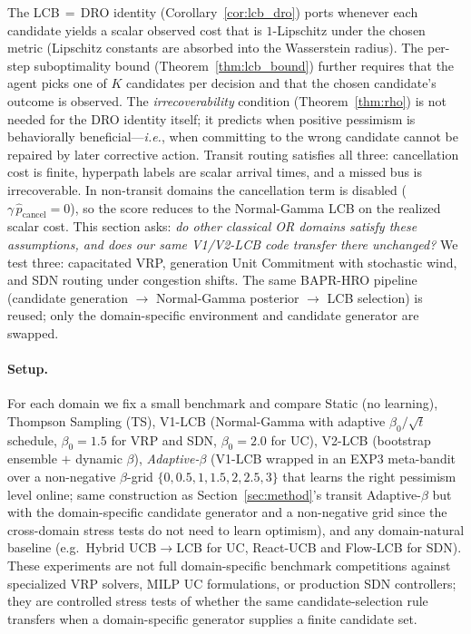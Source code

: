 \documentclass[11pt]{article}
\theoremstyle{definition}
\theoremstyle{remark}
\begin{document}
The LCB$\,=\,$DRO identity (Corollary~\ref{cor:lcb_dro}) ports
whenever each candidate yields a scalar observed cost that is
$1$-Lipschitz under the chosen metric (Lipschitz constants are
absorbed into the Wasserstein radius). The per-step suboptimality
bound (Theorem~\ref{thm:lcb_bound}) further requires that the agent
picks one of $K$ candidates per decision and that the chosen
candidate's outcome is observed. The \emph{irrecoverability}
condition (Theorem~\ref{thm:rho}) is not needed for the DRO identity
itself; it predicts when positive pessimism is behaviorally
beneficial---\emph{i.e.}, when committing to the wrong candidate
cannot be repaired by later corrective action. Transit routing
satisfies all three: cancellation cost is finite, hyperpath labels
are scalar arrival times, and a missed bus is irrecoverable. In
non-transit domains the cancellation term is disabled
($\gamma\,\hat p_{\mathrm{cancel}}=0$), so the score reduces to the
Normal-Gamma LCB on the realized scalar cost.
This section asks: \emph{do other classical OR domains satisfy these
assumptions, and does our same V1/V2-LCB code transfer there
unchanged?} We test three: capacitated VRP, generation Unit
Commitment with stochastic wind, and SDN routing under congestion
shifts. The same BAPR-HRO pipeline (candidate generation $\to$
Normal-Gamma posterior $\to$ LCB selection) is reused; only the
domain-specific environment and candidate generator are swapped.

\paragraph{Setup.}
For each domain we fix a small benchmark and compare Static
(no learning), Thompson Sampling (TS), V1-LCB (Normal-Gamma with
adaptive $\beta_0/\sqrt{t}$ schedule, $\beta_0=1.5$ for VRP and
SDN, $\beta_0=2.0$ for UC), V2-LCB (bootstrap ensemble $+$ dynamic
$\beta$), \emph{Adaptive-$\beta$} (V1-LCB wrapped in an EXP3
meta-bandit over a non-negative $\beta$-grid
$\{0,0.5,1,1.5,2,2.5,3\}$ that learns the right pessimism level
online; same construction as Section~\ref{sec:method}'s transit
Adaptive-$\beta$ but with the domain-specific candidate generator
and a non-negative grid since the cross-domain stress tests do not
need to learn optimism), and any domain-natural baseline (e.g.\
Hybrid UCB$\to$LCB for UC, React-UCB and Flow-LCB for SDN). These experiments are not full
domain-specific benchmark competitions against specialized VRP
solvers, MILP UC formulations, or production SDN controllers; they
are controlled stress tests of whether the same candidate-selection
rule transfers when a domain-specific generator supplies a finite
candidate set.
\end{document}
